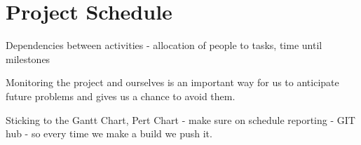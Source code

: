 \documentclass[a4paper,12pt]{article}
\begin{document}
\section*{Project Schedule}

Dependencies between activities - allocation of people to tasks, time until milestones

Monitoring the project and ourselves is an important way for us to anticipate future problems and gives us a chance to avoid them.

Sticking to the Gantt Chart, Pert Chart - make sure on schedule reporting - GIT hub - so every time we make a build we push it.
\end{document}
